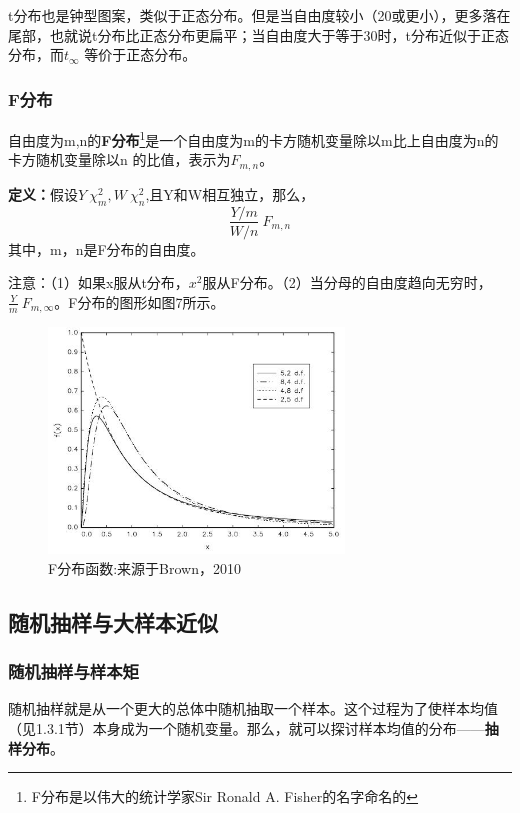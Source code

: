 \documentclass[cn,12pt,math=newtx,citestyle=gb7714-2015,bibstyle=gb7714-2015]{elegantbook}
\begin{document}
	
	t分布也是钟型图案，类似于正态分布。但是当自由度较小（20或更小），更多落在尾部，也就说t分布比正态分布更扁平；当自由度大于等于30时，t分布近似于正态分布，而$t_{\infty}$ 等价于正态分布。
	
	\subsubsection{F分布}
	自由度为m,n的\textbf{F分布}\footnote{F分布是以伟大的统计学家Sir Ronald A. Fisher的名字命名的}是一个自由度为m的卡方随机变量除以m比上自由度为n的卡方随机变量除以n 的比值，表示为$F_{m,n}$。
	
	\textbf{定义：}假设$Y~\chi_m^2,W~\chi_n^2$,且Y和W相互独立，那么，
	\begin{equation}
		\frac{Y/m}{W/n}~F_{m,n}
	\end{equation}
	其中，m，n是F分布的自由度。
	
	注意：（1）如果x服从t分布，$x^2$服从F分布。（2）当分母的自由度趋向无穷时，$\frac{Y}{m}~F_{m,\infty}$。F分布的图形如图7所示。
	\begin{figure}[htbp]
	\centering
	\includegraphics[width=0.7\textwidth]{F.jpg}
	\caption{F分布函数:来源于Brown，2010}\label{fig:digit}
\end{figure}


	
	\subsection{随机抽样与大样本近似}
	\subsubsection{随机抽样与样本矩}
	随机抽样就是从一个更大的总体中随机抽取一个样本。这个过程为了使样本均值（见1.3.1节）本身成为一个随机变量。那么，就可以探讨样本均值的分布——\textbf{抽样分布}。
	
\end{document}
